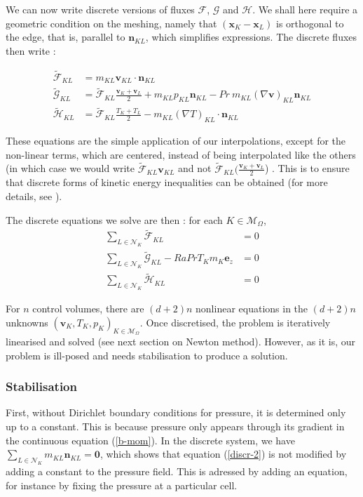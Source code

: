 \documentclass[12pt]{article}
\newcommand{\vb}[1]{\ensuremath{\boldsymbol #1}}
\begin{document}
We can now write discrete versions of fluxes $\mathcal F$, $\mathcal
G$ and $\mathcal H$. We shall here require a geometric condition on
the meshing, namely that $(\vb{x}_{K} - \vb{x_{L}})$ is orthogonal to
the edge, that is, parallel to $\vb{n}_{KL}$, which simplifies
expressions. The discrete fluxes then write :

\begin{align}
  \tilde{\mathcal{F}}_{KL} &= m_{KL} \vb{v}_{KL} \cdot \vb{n}_{KL}\\
  \tilde{\mathcal{G}}_{KL} &= \tilde{\mathcal F}_{KL} \frac{\vb{v}_{K} + \vb{v}_{L}}{2}
  + m_{KL} p_{KL} \vb{n}_{KL}
  - Pr  \ m_{KL} (\nabla \vb{v})_{KL} \vb{n}_{KL}\\
  \tilde{\mathcal{H}}_{KL} &= \tilde{\mathcal F}_{KL} \frac{T_{K} + T_{L}} {2}
  - m_{KL} (\nabla T)_{KL} \cdot \vb{n}_{KL}
\end{align}

These equations are the simple application of our interpolations,
except for the non-linear terms, which are centered, instead of being
interpolated like the others (in which case we would write
$\tilde{\mathcal F}_{KL} \vb{v}_{KL}$ and not $\tilde{\mathcal F}_{KL}
(\frac{\vb{v}_{K} + \vb{v}_{L}}{2}$) . This is to ensure that discrete
forms of kinetic energy inequalities can be obtained (for more
details, see \cite{che-06-num}).

The discrete equations we solve are then : for each $K \in \mathcal
M_{\Omega}$, 
\begin{align}
  \label{discr-1}
  \sum_{L \in \mathcal{N}_K} \tilde{\mathcal{F}}_{KL} &= 0\\
  \label{discr-2}
  \sum_{L \in \mathcal{N}_K} \tilde{\mathcal{G}}_{KL} - Ra Pr T_{K}
  m_K \vb{e_{z}} &= 0\\
  \label{discr-3}
  \sum_{L \in \mathcal{N}_K} \tilde{\mathcal{H}}_{KL} &= 0
\end{align}

For $n$ control volumes, there are $(d+2)n$ nonlinear equations in the
$(d+2)n$ unknowns $(\vb{v}_{K}, T_{K}, p_{K})_{K \in \mathcal
  M_{\Omega}}$. Once discretised, the problem is iteratively linearised and solved
(see next section on Newton method). However, as it is, our problem is
ill-posed and needs stabilisation to produce a solution.

\subsubsection{Stabilisation}
First, without Dirichlet boundary conditions for pressure, it is
determined only up to a constant. This is because pressure only
appears through its gradient in the continuous equation
(\ref{b-mom}). In the discrete system, we have $\sum_{L \in
  \mathcal{N}_{K}} m_{KL} \vb{n}_{KL} = \vb{0}$, which shows that
equation (\ref{discr-2}) is not modified by adding a constant to the
pressure field. This is adressed by adding an equation, for instance
by fixing the pressure at a particular cell.
\end{document}
